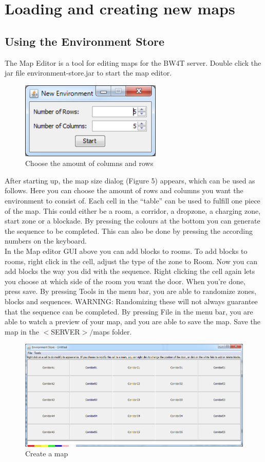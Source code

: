 \documentclass[11pt,a4paper]{article}
\begin{document}
\newpage
\section{Loading and creating new maps}
\subsection{Using the Environment Store}
The Map Editor is a tool for editing maps for the BW4T server. Double click the jar file environment-store.jar to start the map editor.
\begin{figure}
  \begin{center}
    \includegraphics[width=0.6\textwidth]{mapsize.png}
  \end{center}
  \caption{Choose the amount of columns and rows}
\end{figure}
After starting up, the map size dialog (Figure 5) appears, which can be used as follows.
Here you can choose the amount of rows and columns you want the environment to consist of. Each cell in the “table” can be used to fulfill one piece of the map. This could either be a room, a corridor, a dropzone, a charging zone, start zone or a blockade. By pressing the colours at the bottom you can generate the sequence to be completed. This can also be done by pressing the according numbers on the keyboard. \\
In the Map editor GUI above you can add blocks to rooms. To add blocks to rooms, right click in the cell, adjust the type of the zone to Room. Now you can add blocks the way you did with the sequence. Right clicking the cell again lets you choose at which side of the room you want the door. When you're done, press save. 
By pressing Tools in the menu bar, you are able to randomize zones, blocks and sequences. WARNING: Randomizing these will not always guarantee that the sequence can be completed.
By pressing File in the menu bar, you are able to watch a preview of your map, and you are able to save the map. Save the map in the $<$SERVER$>/$maps folder.
\begin{figure}
    \includegraphics[width=\textwidth]{grid.png}
    \caption{Create a map}
\end{figure}
\end{document}
